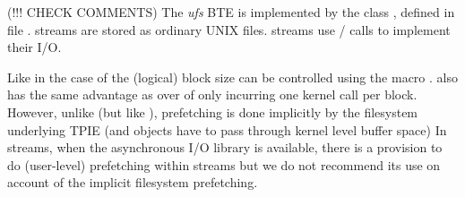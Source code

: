 (!!! CHECK COMMENTS) 
The \emph{ufs} BTE is implemented by the class
, defined in file
.  
streams are stored as ordinary UNIX files.
 streams use
/ calls to implement their
I/O.




Like in the case of  the
(logical) block size can be controlled using the macro
.
 also has the same advantage as
 over  of only incurring
one kernel call per block. However, unlike 
(but like ), prefetching is done
implicitly by the filesystem underlying TPIE (and objects
have to pass through kernel level buffer space)
In  streams, when the asynchronous I/O library
 is available,
there is a provision to do (user-level) prefetching within 
streams but we do not recommend its use on account of the implicit
filesystem prefetching.

